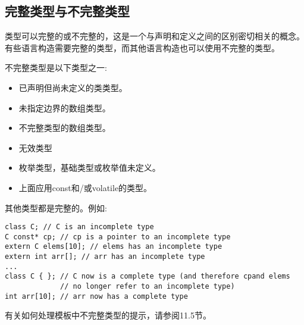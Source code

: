 \subsection{完整类型与不完整类型}

类型可以完整的或不完整的，这是一个与声明和定义之间的区别密切相关的概念。有些语言构造需要完整的类型，而其他语言构造也可以使用不完整的类型。

不完整类型是以下类型之一:

\begin{itemize}
\item 
已声明但尚未定义的类类型。

\item 
未指定边界的数组类型。

\item 
不完整类型的数组类型。

\item 
无效类型

\item 
枚举类型，基础类型或枚举值未定义。

\item 
上面应用const和/或volatile的类型。
\end{itemize}

其他类型都是完整的。例如:

\begin{lstlisting}[style=styleCXX]
class C; // C is an incomplete type
C const* cp; // cp is a pointer to an incomplete type
extern C elems[10]; // elems has an incomplete type
extern int arr[]; // arr has an incomplete type
...
class C { }; // C now is a complete type (and therefore cpand elems
			 // no longer refer to an incomplete type)
int arr[10]; // arr now has a complete type
\end{lstlisting}

有关如何处理模板中不完整类型的提示，请参阅11.5节。























